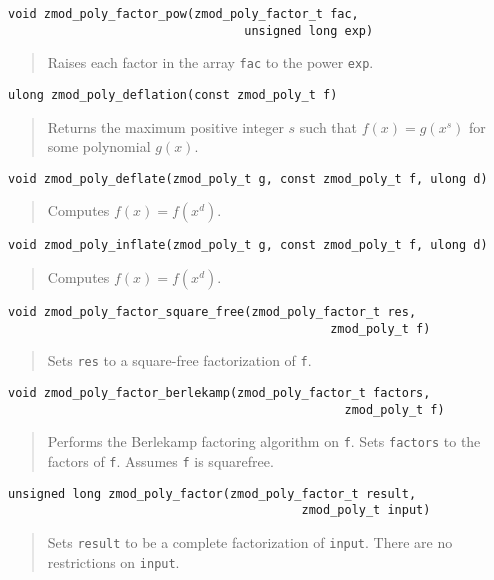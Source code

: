 \documentclass[a4paper,10pt]{article}
\newcommand{\code}{\lstinline}
\begin{document}
\begin{lstlisting}
void zmod_poly_factor_pow(zmod_poly_factor_t fac, 
                                 unsigned long exp)
\end{lstlisting}
\begin{quote}
Raises each factor in the array \code{fac} to the power \code{exp}.
\end{quote}

\begin{lstlisting}
ulong zmod_poly_deflation(const zmod_poly_t f)
\end{lstlisting}
\begin{quote}
Returns the maximum positive integer $s$ such that $f(x) = g(x^s)$ for some polynomial $g(x)$.
\end{quote}

\begin{lstlisting}
void zmod_poly_deflate(zmod_poly_t g, const zmod_poly_t f, ulong d)
\end{lstlisting}
\begin{quote}
Computes $f(x) = f(x^d)$.
\end{quote}

\begin{lstlisting}
void zmod_poly_inflate(zmod_poly_t g, const zmod_poly_t f, ulong d)
\end{lstlisting}
\begin{quote}
Computes $f(x) = f(x^d)$.
\end{quote}

\begin{lstlisting}
void zmod_poly_factor_square_free(zmod_poly_factor_t res,
                                             zmod_poly_t f)
\end{lstlisting}
\begin{quote}
Sets \code{res} to a square-free factorization of \code{f}.
\end{quote}

\begin{lstlisting}
void zmod_poly_factor_berlekamp(zmod_poly_factor_t factors,
                                               zmod_poly_t f)
\end{lstlisting}
\begin{quote}
Performs the Berlekamp factoring algorithm on \code{f}.  Sets \code{factors} to the factors of \code{f}.  Assumes \code{f} is squarefree.  
\end{quote}

\begin{lstlisting}
unsigned long zmod_poly_factor(zmod_poly_factor_t result,
                                         zmod_poly_t input)
\end{lstlisting}
\begin{quote}
Sets \code{result} to be a complete factorization of \code{input}.  There are no restrictions on \code{input}.
\end{quote}
\end{document}
